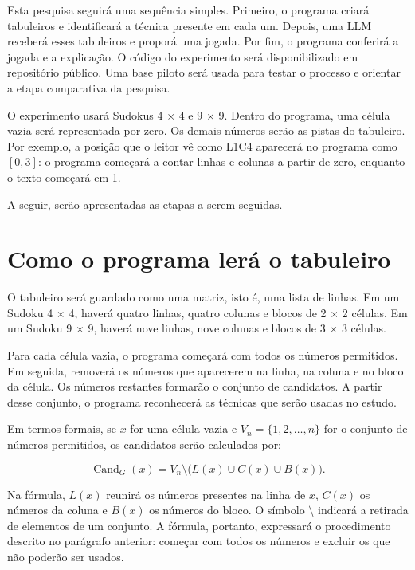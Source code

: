 
Esta pesquisa seguirá uma sequência simples. Primeiro, o programa criará tabuleiros e identificará a técnica presente em cada um. Depois, uma LLM receberá esses tabuleiros e proporá uma jogada. Por fim, o programa conferirá a jogada e a explicação. O código do experimento será disponibilizado em repositório público. Uma base piloto será usada para testar o processo e orientar a etapa comparativa da pesquisa.

O experimento usará Sudokus 4 $\times$ 4 e 9 $\times$ 9. Dentro do programa, uma célula vazia será representada por zero. Os demais números serão as pistas do tabuleiro. Por exemplo, a posição que o leitor vê como L1C4 aparecerá no programa como $[0,3]$: o programa começará a contar linhas e colunas a partir de zero, enquanto o texto começará em 1.

A seguir, serão apresentadas as etapas a serem seguidas.

\section{Como o programa lerá o tabuleiro}

O tabuleiro será guardado como uma matriz, isto é, uma lista de linhas. Em um Sudoku 4 $\times$ 4, haverá quatro linhas, quatro colunas e blocos de 2 $\times$ 2 células. Em um Sudoku 9 $\times$ 9, haverá nove linhas, nove colunas e blocos de 3 $\times$ 3 células.

Para cada célula vazia, o programa começará com todos os números permitidos. Em seguida, removerá os números que aparecerem na linha, na coluna e no bloco da célula. Os números restantes formarão o conjunto de candidatos. A partir desse conjunto, o programa reconhecerá as técnicas que serão usadas no estudo.

Em termos formais, se $x$ for uma célula vazia e $V_n=\{1,2,\ldots,n\}$ for o conjunto de números permitidos, os candidatos serão calculados por:

\[
\operatorname{Cand}_G(x)=V_n\setminus\bigl(L(x)\cup C(x)\cup B(x)\bigr).
\]

Na fórmula, $L(x)$ reunirá os números presentes na linha de $x$, $C(x)$ os números da coluna e $B(x)$ os números do bloco. O símbolo $\setminus$ indicará a retirada de elementos de um conjunto. A fórmula, portanto, expressará o procedimento descrito no parágrafo anterior: começar com todos os números e excluir os que não poderão ser usados.

